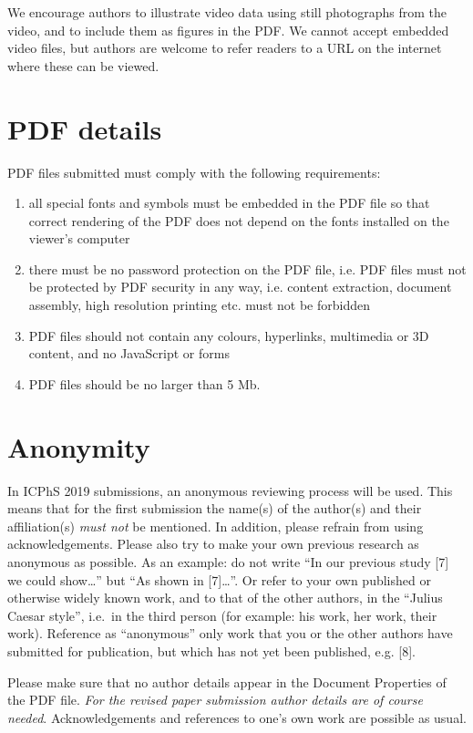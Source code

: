 \documentclass[a4paper,11pt,twocolumn]{article}
\begin{document}
We encourage authors to illustrate video data using still photographs
from the video, and to include them as figures in the PDF. We cannot
accept embedded video files, but authors are welcome to refer readers to
a URL on the internet where these can be viewed.

\section{PDF details}

PDF files submitted must comply with the following requirements:

\begin{enumerate}
  \item all special fonts and symbols must be embedded in the PDF file so 
  that correct rendering of the PDF does not depend on the fonts installed 
  on the viewer's computer
  \item there must be no password protection on the PDF file, i.e. PDF files 
  must not be protected by PDF security in any way, i.e. content extraction, 
  document assembly, high resolution printing etc. must not be forbidden
  \item PDF files should not contain any colours, hyperlinks, multimedia or 
  3D content, and no JavaScript or forms
  \item PDF files should be no larger than 5 Mb.
\end{enumerate}

\section{Anonymity}

In ICPhS 2019 submissions, an anonymous reviewing process will be used.
This means that for the first submission the name(s) of the author(s)
and their affiliation(s) \emph{must not} be mentioned. In addition,
please refrain from using acknowledgements. Please also try to make your
own previous research as anonymous as possible. As an example: do not
write ``In our previous study {[}7{]} we could show\ldots'' but ``As
shown in {[}7{]}\ldots''. Or refer to your own published or otherwise
widely known work, and to that of the other authors, in the ``Julius
Caesar style'', i.e.~in the third person (for example: his work, her
work, their work). Reference as ``anonymous'' only work that you or the
other authors have submitted for publication, but which has not yet been
published, e.g. {[}8{]}.

Please make sure that no author details appear in the Document
Properties of the PDF file.
\emph{For the revised paper submission author details are of 
course needed}. Acknowledgements and references to one's own work are
possible as usual.
\end{document}
